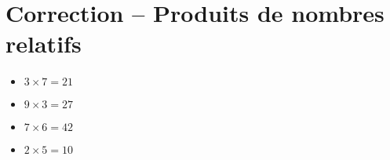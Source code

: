 \documentclass[a4paper,11pt,fleqn]{article}
\begin{document}
\section{Correction -- Produits de nombres relatifs}
\begin{itemize}

  \item $3\times7=21$
  \item $9\times3=27$
  \item $7\times6=42$
  \item $2\times5=10$
\end{itemize}
\end{document}
